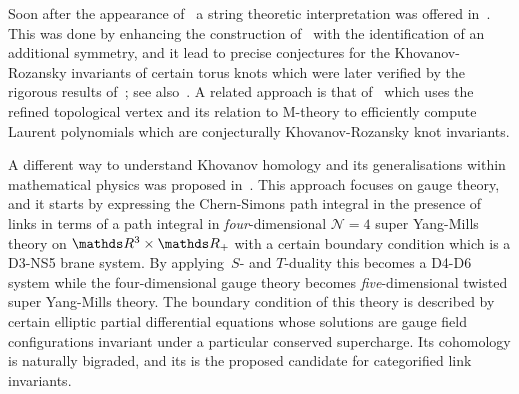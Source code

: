 \documentclass{compositio}
\theoremstyle{definition}
\numberwithin{equation}{section}
\begin{document}
Soon after the appearance of~\cite{kr0401268} a string theoretic interpretation was offered in~\cite{gsv0412243}. This was done by enhancing the construction of~\cite{ov9912123} with the identification of an additional symmetry, and it lead to precise conjectures for the Khovanov-Rozansky invariants of certain torus knots which were later verified by the rigorous results of~\cite{r0508510, r0607544}; see also~\cite{dgr0505662, gw0512298}. A related approach is that of~\cite{as1105.5117} which uses the refined topological vertex and its relation to M-theory to efficiently compute Laurent polynomials which are conjecturally Khovanov-Rozansky knot invariants. 

A different way to understand Khovanov homology and its generalisations within mathematical physics was proposed in~\cite{w1101.3216}. This approach focuses on gauge theory, and it starts by expressing the Chern-Simons path integral in the presence of links in terms of a path integral in \emph{four}-dimensional $\mathcal N=4$ super Yang-Mills theory on $\nR^3\times\nR_{+}$ with a certain boundary condition which is a D3-NS5 brane system. By applying~$S$- and $T$-duality this becomes a D4-D6 system while the four-dimensional gauge theory becomes \emph{five}-dimensional twisted super Yang-Mills theory. The boundary condition of this theory is described by certain elliptic partial differential equations whose solutions are gauge field configurations invariant under a particular conserved supercharge. Its cohomology is naturally bigraded, and its is the proposed candidate for categorified link invariants. 

\medskip
\end{document}
